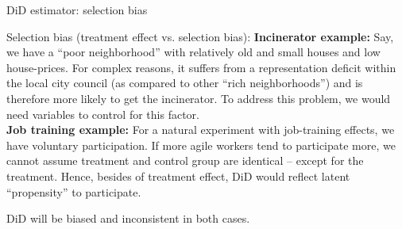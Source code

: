 \documentclass{beamer}
\begin{document}
\begin{frame}{DiD estimator: selection bias}
\begin{block}{Selection bias (treatment effect vs. selection bias):}
\small
\textbf{Incinerator example:} Say, we have a “poor neighborhood” with relatively old and small houses and low house-prices. For complex reasons, it suffers from a representation deficit within the local city council (as compared to other “rich neighborhoods”) and is therefore more likely to get the incinerator. To address this problem, we would need variables to control for this factor.\\
\medskip
\textbf{Job training example:} For a natural experiment with job-training effects, we have voluntary participation. If more agile workers tend to participate more, we cannot assume treatment and control group are identical -- except for the treatment. Hence, besides of treatment effect, DiD would reflect latent ``propensity'' to participate.
\end{block}
\medskip 
DiD will be biased and inconsistent in both cases.
\end{frame}
\end{document}
